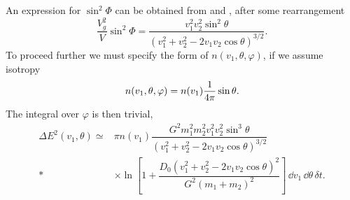 An expression for $\sin^2\Phi$ can be obtained from  and , after some rearrangement
\begin{equation}
\dfrac{V_g^2}{V}\sin^2\Phi = \dfrac{v_1^2v_2^2\sin^2\theta}{\left(v_1^2 + v_2^2 - 2v_1 v_2 \cos\theta\right)^{3/2}}.
\end{equation}
To proceed further we must specify the form of $n(v_1,\theta,\varphi)$, if we assume isotropy
\begin{equation}
n(v_1,\theta,\varphi) = n(v_1)\dfrac{1}{4\pi}\sin\theta.
\end{equation}
The integral over $\varphi$ is then trivial,
\begin{align}
\Delta E^2(v_1,\theta) \simeq {} & \pi n(v_1)\dfrac{G^2m_1^2 m_2^2v_1^2v_2^2\sin^3\theta}{\left(v_1^2 + v_2^2 - 2v_1 v_2 \cos\theta\right)^{3/2}} \nonumber \\*
 {} & \times \left. \ln\left[1 + \dfrac{D_0\left(v_1^2 + v_2^2 - 2v_1 v_2 \cos\theta\right)^2}{G^2\left(m_1 + m_2\right)^2}\right]\,\dd v_1\,\dd\theta\,\delta t.\right.
\end{align}

